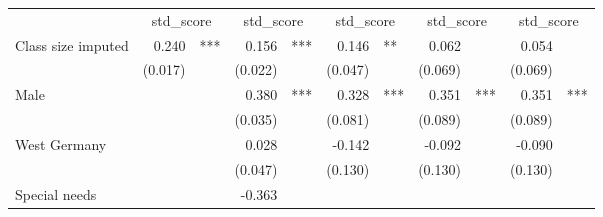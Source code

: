 \documentclass{article}
\begin{document}
\begin{table}[!h]
\centering
\begin{tabular}{lllllllllll}
\cline{1-11}
\multicolumn{1}{r}{} &
  \multicolumn{2}{c}{std\_score} &
  \multicolumn{2}{c}{std\_score} &
  \multicolumn{2}{c}{std\_score} &
  \multicolumn{2}{c}{std\_score} &
  \multicolumn{2}{c}{std\_score} \\
\cline{1-11}
\multicolumn{1}{l}{Class size imputed} &
  \multicolumn{1}{r}{0.240} &
  \multicolumn{1}{l}{***} &
  \multicolumn{1}{r}{0.156} &
  \multicolumn{1}{l}{***} &
  \multicolumn{1}{r}{0.146} &
  \multicolumn{1}{l}{**} &
  \multicolumn{1}{r}{0.062} &
  \multicolumn{1}{l}{} &
  \multicolumn{1}{r}{0.054} &
  \multicolumn{1}{l}{} \\
\multicolumn{1}{l}{} &
  \multicolumn{1}{r}{(0.017)} &
  \multicolumn{1}{l}{} &
  \multicolumn{1}{r}{(0.022)} &
  \multicolumn{1}{l}{} &
  \multicolumn{1}{r}{(0.047)} &
  \multicolumn{1}{l}{} &
  \multicolumn{1}{r}{(0.069)} &
  \multicolumn{1}{l}{} &
  \multicolumn{1}{r}{(0.069)} &
  \multicolumn{1}{l}{} \\
\multicolumn{1}{l}{Male} &
  \multicolumn{1}{r}{} &
  \multicolumn{1}{l}{} &
  \multicolumn{1}{r}{0.380} &
  \multicolumn{1}{l}{***} &
  \multicolumn{1}{r}{0.328} &
  \multicolumn{1}{l}{***} &
  \multicolumn{1}{r}{0.351} &
  \multicolumn{1}{l}{***} &
  \multicolumn{1}{r}{0.351} &
  \multicolumn{1}{l}{***} \\
\multicolumn{1}{l}{} &
  \multicolumn{1}{r}{} &
  \multicolumn{1}{l}{} &
  \multicolumn{1}{r}{(0.035)} &
  \multicolumn{1}{l}{} &
  \multicolumn{1}{r}{(0.081)} &
  \multicolumn{1}{l}{} &
  \multicolumn{1}{r}{(0.089)} &
  \multicolumn{1}{l}{} &
  \multicolumn{1}{r}{(0.089)} &
  \multicolumn{1}{l}{} \\
\multicolumn{1}{l}{West Germany} &
  \multicolumn{1}{r}{} &
  \multicolumn{1}{l}{} &
  \multicolumn{1}{r}{0.028} &
  \multicolumn{1}{l}{} &
  \multicolumn{1}{r}{-0.142} &
  \multicolumn{1}{l}{} &
  \multicolumn{1}{r}{-0.092} &
  \multicolumn{1}{l}{} &
  \multicolumn{1}{r}{-0.090} &
  \multicolumn{1}{l}{} \\
\multicolumn{1}{l}{} &
  \multicolumn{1}{r}{} &
  \multicolumn{1}{l}{} &
  \multicolumn{1}{r}{(0.047)} &
  \multicolumn{1}{l}{} &
  \multicolumn{1}{r}{(0.130)} &
  \multicolumn{1}{l}{} &
  \multicolumn{1}{r}{(0.130)} &
  \multicolumn{1}{l}{} &
  \multicolumn{1}{r}{(0.130)} &
  \multicolumn{1}{l}{} \\
\multicolumn{1}{l}{Special needs} &
  \multicolumn{1}{r}{} &
  \multicolumn{1}{l}{} &
  \multicolumn{1}{r}{-0.363} &

\end{tabular}
\end{table}
\end{document}
